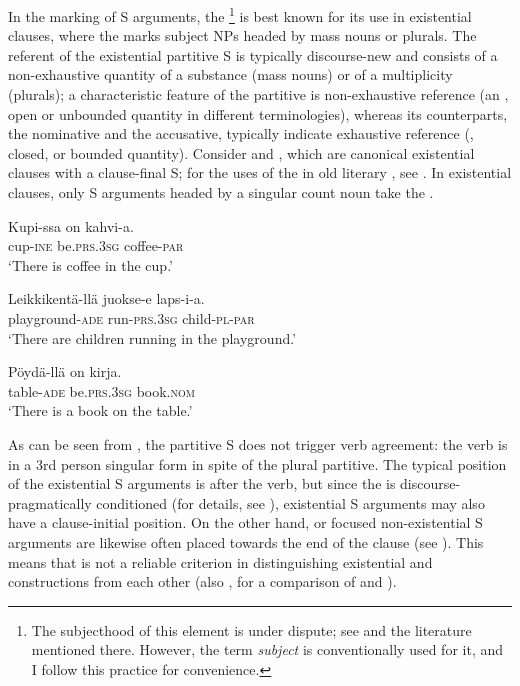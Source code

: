 \documentclass[output=paper]{LSP/langsci}
\begin{document}
In the marking of S arguments, the  \footnote{The subjecthood of this element is under dispute; see \citet{Huumoetal2015Subject} and the literature mentioned there. However, the term \textit{subject} is conventionally used for it, and I follow this practice for convenience.} is best known for its use in existential clauses, where the  marks subject NPs headed by mass nouns or plurals. The referent of the existential partitive S is typically discourse-new and consists of a non-exhaustive quantity of a substance (mass nouns) or of a multiplicity (plurals); a characteristic feature of the partitive is non-exhaustive reference (an , open or unbounded quantity in different terminologies), whereas its counterparts, the nominative and the accusative, typically indicate exhaustive reference (, closed, or bounded quantity). Consider  and , which are canonical existential clauses with a clause-final S; for the uses of the  in old literary , see \citet{DeSmit2016Fluid}.
In existential clauses, only S arguments headed by a singular count noun take the  .

\ea\label{15-hu-ex:1}
\gll Kupi-ssa on kahvi-a.\\
cup-\textsc{ine} be.\textsc{prs}.\textsc{3sg} coffee-\textsc{par}\\
\glt ‘There is coffee in the cup.’
\z

\ea%
\label{15-hu-ex:2}
\gll Leikkikentä-llä juokse-e laps-i-a.\\
playground-\textsc{ade} run-\textsc{prs}.\textsc{3sg} child-\textsc{pl}-\textsc{par}\\
\glt ‘There are children running in the playground.’
\z

\ea%
\label{15-hu-ex:3}
\gll Pöydä-llä on kirja.\\
table-\textsc{ade} be.\textsc{prs}.\textsc{3sg} book.\textsc{nom}\\
\glt ‘There is a book on the table.’
\z

As can be seen from , the partitive S does not trigger verb agreement: the verb is in a 3rd person singular form in spite of the plural partitive. The typical position of the existential S arguments is after the verb, but since the   is discourse-pragmatically conditioned (for details, see \citealt[35–62]{Vilkuna1989Free}), existential S arguments may also have a clause-initial position. On the other hand,  or focused non-existential S arguments are likewise often placed towards the end of the clause (see \citealt[187–191]{Vilkuna1989Free}). This means that  is not a reliable criterion in distinguishing existential and   constructions from each other (\cf also \citealt{Huumoetal2014Partitives}, for a comparison of  and ). 
\end{document}
